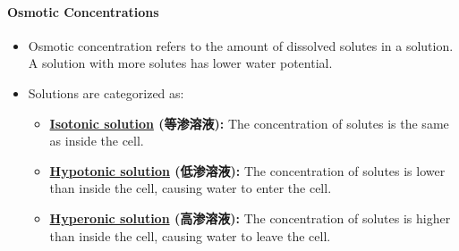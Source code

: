 \paragraph{Osmotic Concentrations}
\begin{itemize}
    \item Osmotic concentration refers to the amount of dissolved solutes in a solution. A solution with more solutes has lower
    water potential.
    \item Solutions are categorized as:
    \begin{itemize}
        \item \textbf{\underline{Isotonic solution} (等渗溶液):} The concentration of solutes is the same as inside the cell.
        \item \textbf{\underline{Hypotonic solution} (低渗溶液):} The concentration of solutes is lower than inside the cell,
        causing water to enter the cell.
        \item \textbf{\underline{Hyperonic solution} (高渗溶液):} The concentration of solutes is higher than inside the cell,
        causing water to leave the cell.
    \end{itemize}
\end{itemize}

